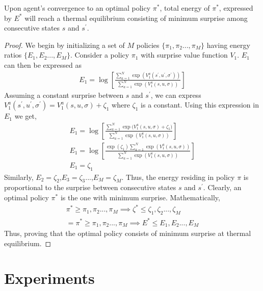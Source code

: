 \documentclass{article}
\begin{document}
\begin{multicols}{2}
\begin{customthm}{2}
Upon agent's convergence to an optimal policy $\pi^{*}$, total energy of $\pi^{*}$, expressed by $E^{*}$ will reach a thermal equilibrium consisting of minimum surprise among consecutive states $s$ and $s^{'}$.
\end{customthm}
\begin{proof}
  We begin by initializing a set of $M$ policies $\{\pi_{1},\pi_{2}...,\pi_{M}\}$ having energy ratios $\{E_{1},E_{2}...,E_{M}\}$. Consider a policy $\pi_{1}$ with surprise value function $V_{1}$. $E_{1}$ can then be expressed as
  \begin{gather}
      E_{1} = \log [\frac{\sum_{a=1}^{N}\exp{(V_{1}^{a}(s^{'},u^{'},\sigma^{'}))}}{\sum_{a=1}^{N}\exp{(V_{1}^{a}(s,u,\sigma))}}] \nonumber
  \end{gather}
  Assuming a constant surprise between $s$ and $s^{'}$, we can express $V_{1}^{a}(s^{'},u^{'},\sigma^{'}) = V_{1}^{a}(s,u,\sigma) + \zeta_{1}$ where $\zeta_{1}$ is a constant. Using this expression in $E_{1}$ we get,
  \begin{gather}
      E_{1} = \log [\frac{\sum_{a=1}^{N}\exp{(V_{1}^{a}(s,u,\sigma) + \zeta_{1}})}{\sum_{a=1}^{N}\exp{(V_{1}^{a}(s,u,\sigma))}}] \nonumber \\
      E_{1} = \log [\frac{\exp{(\zeta_{1})}\sum_{a=1}^{N}\exp{(V_{1}^{a}(s,u,\sigma))}}{\sum_{a=1}^{N}\exp{(V_{1}^{a}(s,u,\sigma))}}] \nonumber \\    
      E_{1} = \zeta_{1} \nonumber        
  \end{gather}
  Similarly, $E_{2}=\zeta_{2}$,$E_{3}=\zeta_{3}$...,$E_{M}=\zeta_{M}$. Thus, the energy residing in policy $\pi$ is proportional to the surprise between consecutive states $s$ and $s^{'}$. Clearly, an optimal policy $\pi^{*}$ is the one with minimum surprise. Mathematically,
  \begin{gather}
      \pi^{*} \geq \pi_{1},\pi_{2}...,\pi_{M} \implies \zeta^{*} \leq \zeta_{1},\zeta_{2}...,\zeta_{M} \nonumber \\
      = \pi^{*} \geq \pi_{1},\pi_{2}...,\pi_{M} \implies E^{*} \leq E_{1},E_{2}...,E_{M} \nonumber
  \end{gather}
  Thus, proving that the optimal policy consists of minimum surprise at thermal equilibrium. 
\end{proof}





\section{Experiments}


\end{multicols}
\end{document}
